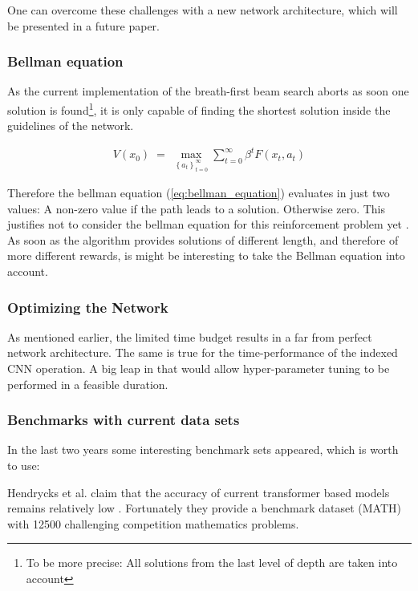 \documentclass{scrartcl}
\theoremstyle{definition}
\begin{document}
One can overcome these challenges with a new network architecture, which will be presented in a future paper.

\subsubsection{Bellman equation}

As the current implementation of the breath-first beam search aborts as soon one solution is found\footnote{To be more precise: All solutions from the last level of depth are taken into account},
it is only capable of finding the shortest solution inside the guidelines of the network. 

\begin{align}
	V(x_{0})\;=\;\max _{\left\{a_{t}\right\}_{t=0}^{\infty }}\sum _{t=0}^{\infty }\beta ^{t}F(x_{t},a_{t})
	\label{eq:bellman_equation}
\end{align}

Therefore the bellman equation (\ref{eq:bellman_equation}) evaluates in just two values: A non-zero value if the path leads to a solution. Otherwise zero.
This justifies not to consider the bellman equation for this reinforcement problem yet \cite{bellman}.
As soon as the algorithm provides solutions of different length, and therefore of more different rewards, is might be interesting to take the Bellman equation into account.


\subsubsection{Optimizing the Network}

As mentioned earlier, the limited time budget results in a far from perfect network architecture.
The same is true for the time-performance of the indexed CNN operation.
A big leap in that would allow hyper-parameter tuning to be performed in a feasible duration.

\subsubsection{Benchmarks with current data sets}

In the last two years some interesting benchmark sets appeared, which is worth to use:

Hendrycks et al. claim that the accuracy of current transformer based models remains relatively low \cite{hendrycks2021measuring}.
Fortunately they provide a benchmark dataset (MATH) with 12500 challenging competition mathematics problems.
\end{document}
